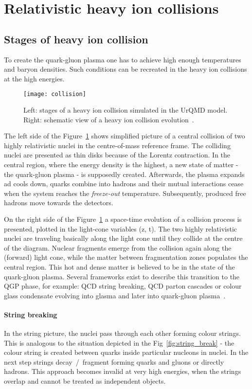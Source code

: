   \section{Relativistic heavy ion collisions}
    \subsection{Stages of heavy ion collision}

      To create the quark-gluon plasma one has to achieve high enough temperatures and baryon densities.
      Such conditions can be recreated in the heavy ion collisions at the high energies.
      \begin{figure}[h]
        \centering
        \texttt{[image: collision]}
        \caption{Left: stages of a heavy ion collision simulated in the UrQMD model. Right: schematic view of a heavy ion collision evolution~\cite{drkisiel}.}
        \label{fig:colision}
      \end{figure}
      The left side of the Figure~\ref{fig:colision} shows simplified picture of a central collision of two highly relativistic nuclei in the centre-of-mass reference frame.
      The colliding nuclei are presented as thin disks because of the Lorentz contraction.
      In the central region, where the energy density is the highest, a new state of matter - the quark-gluon plasma - is supposedly created.
      Afterwards, the plasma expands ad cools down, quarks combine into hadrons and their mutual interactions cease when the system reaches the \textit{freeze-out} temperature.
      Subsequently, produced free hadrons move towards the detectors.

      On the right side of the Figure~\ref{fig:colision} a space-time evolution of a collision process is presented, plotted in the light-cone variables (z, t).
      The two highly relativistic nuclei are traveling basically along the light cone until they collide at the centre of the diagram. 
      Nuclear fragments emerge from the collision again along the (forward) light cone, while the matter between fragmentation zones populates the central region.
      This hot and dense matter is believed to be in the state of the quark-gluon plasma.
      Several frameworks exist to describe this transition to the QGP phase, for example: QCD string breaking, QCD parton cascades or colour glass condensate evolving into glasma and later into quark-gluon plasma~\cite{florkowski}.
      \paragraph{String breaking}
      In the string picture, the nuclei pass through each other forming colour strings.
      This is analogous to the situation depicted in the Fig~\ref{fig:string_break} -  the colour string is created between quarks inside particular nucleons in nuclei.
      In the next step strings decay~/~fragment forming quarks and gluons or directly hadrons.
      This approach becomes invalid at very high energies, when the strings overlap and cannot be treated as independent objects.
